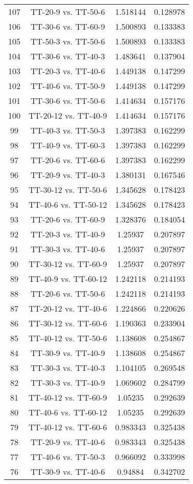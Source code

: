 \documentclass[a4paper,10pt]{article}
\begin{document}
\begin{landscape}
\begin{table}[!htp]
\begin{tabular}{cccc}
107&TT-20-9 vs. TT-50-6&1.518144&0.128978\\
106&TT-30-6 vs. TT-60-9&1.500893&0.133383\\
105&TT-50-3 vs. TT-50-6&1.500893&0.133383\\
104&TT-30-6 vs. TT-40-3&1.483641&0.137904\\
103&TT-20-3 vs. TT-40-6&1.449138&0.147299\\
102&TT-40-6 vs. TT-50-9&1.449138&0.147299\\
101&TT-30-6 vs. TT-50-6&1.414634&0.157176\\
100&TT-20-12 vs. TT-40-9&1.414634&0.157176\\
99&TT-40-3 vs. TT-50-3&1.397383&0.162299\\
98&TT-40-9 vs. TT-60-3&1.397383&0.162299\\
97&TT-20-6 vs. TT-60-6&1.397383&0.162299\\
96&TT-20-9 vs. TT-40-3&1.380131&0.167546\\
95&TT-30-12 vs. TT-50-6&1.345628&0.178423\\
94&TT-40-6 vs. TT-50-12&1.345628&0.178423\\
93&TT-20-6 vs. TT-60-9&1.328376&0.184054\\
92&TT-20-3 vs. TT-40-9&1.25937&0.207897\\
91&TT-30-3 vs. TT-40-6&1.25937&0.207897\\
90&TT-30-12 vs. TT-60-9&1.25937&0.207897\\
89&TT-40-9 vs. TT-60-12&1.242118&0.214193\\
88&TT-20-6 vs. TT-50-6&1.242118&0.214193\\
87&TT-20-12 vs. TT-40-6&1.224866&0.220626\\
86&TT-30-12 vs. TT-60-6&1.190363&0.233904\\
85&TT-40-12 vs. TT-50-6&1.138608&0.254867\\
84&TT-30-9 vs. TT-40-9&1.138608&0.254867\\
83&TT-30-3 vs. TT-40-3&1.104105&0.269548\\
82&TT-30-3 vs. TT-40-9&1.069602&0.284799\\
81&TT-40-12 vs. TT-60-9&1.05235&0.292639\\
80&TT-40-6 vs. TT-60-12&1.05235&0.292639\\
79&TT-40-12 vs. TT-60-6&0.983343&0.325438\\
78&TT-20-9 vs. TT-40-6&0.983343&0.325438\\
77&TT-40-6 vs. TT-50-3&0.966092&0.333998\\
76&TT-30-9 vs. TT-40-6&0.94884&0.342702\\

\end{tabular}
\end{table}
\end{landscape}
\end{document}
